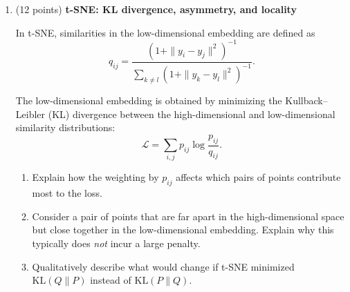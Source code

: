 \begin{enumerate}







\item (12 points) \textbf{t-SNE: KL divergence, asymmetry, and locality}

In t-SNE, similarities in the low-dimensional embedding are defined as
\[
q_{ij} =
\frac{(1 + \|y_i - y_j\|^2)^{-1}}
{\sum_{k \neq l} (1 + \|y_k - y_l\|^2)^{-1}}.
\]

The low-dimensional embedding is obtained by minimizing the Kullback--Leibler (KL)
divergence between the high-dimensional and low-dimensional similarity distributions:
\[
\mathcal{L} = \sum_{i,j} p_{ij} \log \frac{p_{ij}}{q_{ij}}.
\]

\begin{enumerate}
    \item Explain how the weighting by $p_{ij}$ affects which pairs of points
    contribute most to the loss.
    \item  Consider a pair of points that are far apart in the high-dimensional
    space but close together in the low-dimensional embedding. Explain why this
    typically does \emph{not} incur a large penalty.
    \item Qualitatively describe what would change if t-SNE minimized
    $\mathrm{KL}(Q\|P)$ instead of $\mathrm{KL}(P\|Q)$.
\end{enumerate}


\end{enumerate}
